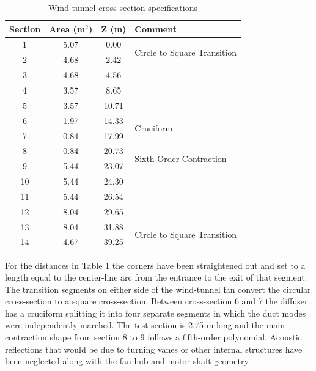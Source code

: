 \begin{table}
  \centering
  \caption{Wind-tunnel cross-section specifications}
  \begin{tabular}{c c c l}
    Section & Area (m$^2$) & Z (m) & Comment \\
    \hline \hline
    1 & 5.07 & 0.00 & \multirow{2}{2in}{Circle to Square Transition}\\
    2 & 4.68 & 2.42 & \\
    3 & 4.68 & 4.56 & \\
    4 & 3.57 & 8.65 & \\
    5 & 3.57 & 10.71 & \\
    6 & 1.97 & 14.33 & \multirow{2}{2in}{Cruciform}\\
    7 & 0.84 & 17.99 & \multirow{2}{2in}{Test-Section}\\
    8 & 0.84 & 20.73 & \multirow{2}{2in}{Sixth Order Contraction}\\
    9 & 5.44 & 23.07 & \\
    10 & 5.44 & 24.30 & \\
    11 & 5.44 & 26.54 & \\
    12 & 8.04 & 29.65 & \\
    13 & 8.04 & 31.88 & \multirow{2}{2in}{Circle to Square Transition}\\
    14 & 4.67 & 39.25 & \\
  \end{tabular}
  \label{tab:03_wind_tunnel_specs}
\end{table}
For the distances in Table \ref{tab:03_wind_tunnel_specs} the corners have been straightened out and set to a length equal to the center-line arc from the entrance to the exit of that segment.
The transition segments on either side of the wind-tunnel fan convert the circular cross-section to a square cross-section.
Between cross-section 6 and 7 the diffuser has a cruciform splitting it into four separate segments in which the duct modes were independently marched.
The test-section is 2.75 m long and the main contraction shape from section 8 to 9 follows a fifth-order polynomial.
Acoustic reflections that would be due to turning vanes or other internal structures have been neglected along with the fan hub and motor shaft geometry.

